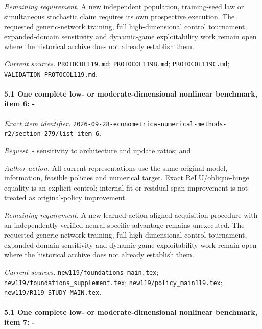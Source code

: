 \par\emph{Remaining requirement.} A new independent population, training-seed law or simultaneous stochastic claim requires its own prospective execution. The requested generic-network training, full high-dimensional control tournament, expanded-domain sensitivity and dynamic-game exploitability work remain open where the historical archive does not already establish them.

\par\emph{Current sources.} \nolinkurl{PROTOCOL119.md}; \nolinkurl{PROTOCOL119B.md}; \nolinkurl{PROTOCOL119C.md}; \nolinkurl{VALIDATION_PROTOCOL119.md}.

\paragraph{5.1 One complete low- or moderate-dimensional nonlinear benchmark, item 6: -}

\emph{Exact item identifier.} \nolinkurl{2026-09-28-econometrica-numerical-methods-r2/section-279/list-item-6}.

\par\emph{Request.} - sensitivity to architecture and update ratios; and

\par\emph{Author action.} All current representations use the same original model, information, feasible policies and numerical target. Exact ReLU/\allowbreak{}oblique-hinge equality is an explicit control; internal fit or residual-span improvement is not treated as original-policy improvement.

\par\emph{Remaining requirement.} A new learned action-aligned acquisition procedure with an independently verified neural-specific advantage remains unexecuted. The requested generic-network training, full high-dimensional control tournament, expanded-domain sensitivity and dynamic-game exploitability work remain open where the historical archive does not already establish them.

\par\emph{Current sources.} \nolinkurl{new119/foundations_main.tex}; \nolinkurl{new119/foundations_supplement.tex}; \nolinkurl{new119/policy_main119.tex}; \nolinkurl{new119/R119_STUDY_MAIN.tex}.

\paragraph{5.1 One complete low- or moderate-dimensional nonlinear benchmark, item 7: -}

